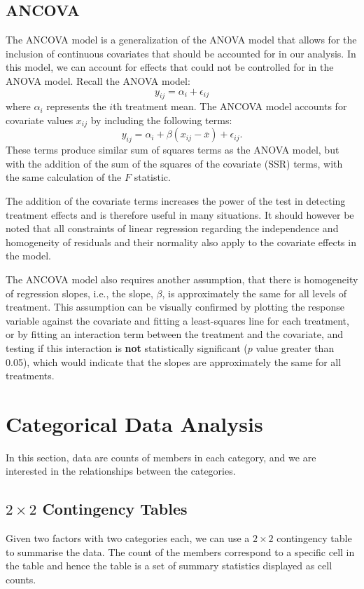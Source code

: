 \documentclass{article}
\begin{document}
\subsection{ANCOVA}
The ANCOVA model is a generalization of the ANOVA model that allows for the inclusion of continuous
covariates that should be accounted for in our analysis. In this model, we can
account for effects that could not be controlled for in the ANOVA model.
Recall the ANOVA model:
\begin{equation*}
    y_{ij} = \alpha_i + \epsilon_{ij}
\end{equation*}
where \(\alpha_i\) represents the \(i\)th treatment mean. The ANCOVA model accounts for covariate values \(x_{ij}\)
by including the following terms:
\begin{equation*}
    y_{ij} = \alpha_i + \beta\left( x_{ij} - \overline{x} \right) + \epsilon_{ij}.
\end{equation*}
These terms produce similar sum of squares terms as the ANOVA model, but with the addition of the
sum of the squares of the covariate (SSR) terms, with the same calculation of the \(F\) statistic.

The addition of the covariate terms increases the power of the test in detecting treatment effects and is
therefore useful in many situations. It should however be noted that all constraints of linear regression
regarding the independence and homogeneity of residuals and their normality also apply to the covariate effects
in the model.

The ANCOVA model also requires another assumption, that there is homogeneity of regression slopes, i.e.,
the slope, \(\beta\), is approximately the same for all levels of treatment. This assumption can be visually confirmed by
plotting the response variable against the covariate and fitting a least-squares line for each treatment,
or by fitting an interaction term between the treatment and the covariate, and testing if this interaction is
\textbf{not} statistically significant (\(p\) value greater than 0.05), which would indicate that the slopes
are approximately the same for all treatments.
\section{Categorical Data Analysis}
In this section, data are counts of members in each category, and we are interested in the relationships between the
categories.
\subsection{\texorpdfstring{\(2 \times 2\)}{2x2} Contingency Tables}
Given two factors with two categories each, we can use a \(2 \times 2\) contingency table to summarise the data.
The count of the members correspond to a specific cell in the table and hence the table is a set of summary statistics displayed
as cell counts.
\end{document}
